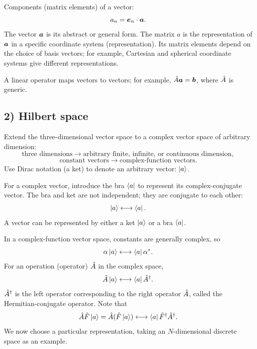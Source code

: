 Components (matrix elements) of a vector:
\begin{equation}
a_n=\bm{e}_n\cdot\bm{a}.
\end{equation}
The vector $\bm{a}$ is its abstract or general form. The matrix $a$ is the representation of $\bm{a}$ in a specific coordinate system (representation). Its matrix elements depend on the choice of basis vectors; for example, Cartesian and spherical coordinate systems give different representations.

A linear operator maps vectors to vectors; for example, $\hat{A}\bm{a}=\bm{b}$, where $\hat{A}$ is generic.
\subsection*{2) Hilbert space}
Extend the three-dimensional vector space to a complex vector space of arbitrary dimension:
\begin{equation}
\text{three dimensions}\longrightarrow\text{arbitrary finite, infinite, or continuous dimension},
\end{equation}
\begin{equation}
\text{constant vectors}\longrightarrow\text{complex-function vectors}.
\end{equation}
Use Dirac notation (a ket) to denote an arbitrary vector: $\left|a\right\rangle$.

For a complex vector, introduce the bra $\left\langle a\right|$ to represent its complex-conjugate vector. The bra and ket are not independent; they are conjugate to each other:
\begin{equation}
\left|a\right\rangle\longleftrightarrow\left\langle a\right|.
\end{equation}
A vector can be represented by either a ket $\left|a\right\rangle$ or a bra $\left\langle a\right|$.

In a complex-function vector space, constants are generally complex, so
\begin{equation}
\alpha\left|a\right\rangle\longleftrightarrow\left\langle a\right|\alpha^*.
\end{equation}
For an operation (operator) $\hat{A}$ in the complex space,
\begin{equation}
\hat{A}\left|a\right\rangle\longleftrightarrow\left\langle a\right|\hat{A}^\dagger.
\end{equation}
$\hat{A}^\dagger$ is the left operator corresponding to the right operator $\hat{A}$, called the Hermitian-conjugate operator. Note that
\begin{equation}
\hat{A}\hat{F}\left|a\right\rangle=\hat{A}(\hat{F}\left|a\right\rangle)
\longleftrightarrow \left\langle a\right|\hat{F}^\dagger\hat{A}^\dagger.
\end{equation}
We now choose a particular representation, taking an $N$-dimensional discrete space as an example.

